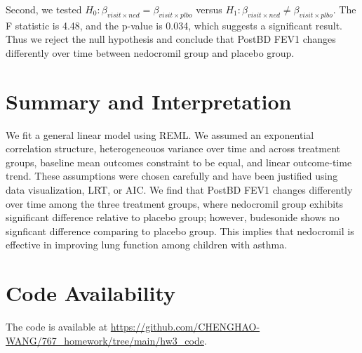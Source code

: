 \documentclass[12pt]{article}
\begin{document}
Second, we tested $H_0: \beta_{visit \times ned} = \beta_{visit \times plbo}$
versus $H_1: \beta_{visit \times ned} \neq \beta_{visit \times plbo}$.
The F statistic is 4.48, and the p-value is 0.034, which suggests
a significant result. Thus we reject the null hypothesis and conclude
that PostBD FEV1 changes differently over time between nedocromil
group and placebo group.


\section{Summary and Interpretation}

We fit a general linear model using REML. We assumed an exponential
correlation structure, heterogeneouos variance over time and across
treatment groups, baseline mean outcomes constraint to be equal,
and linear outcome-time trend. These assumptions were chosen carefully
and have been justified using data visualization, LRT, or AIC.
We find that PostBD FEV1 changes differently over time among
the three treatment groups, where nedocromil group exhibits significant
difference relative to placebo group; however, budesonide shows
no signficant difference comparing to placebo group.
This implies that nedocromil is effective in improving
lung function among children with asthma.

\section{Code Availability}

The code is available at \url{https://github.com/CHENGHAO-WANG/767_homework/tree/main/hw3_code}.
\end{document}
